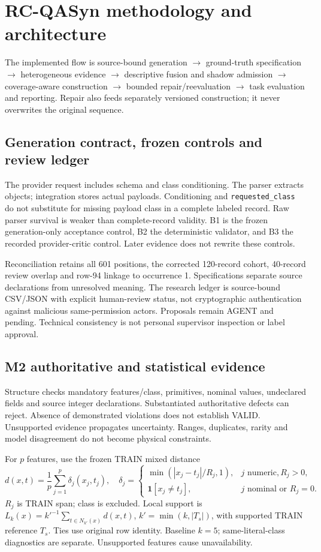 \section{RC-QASyn methodology and architecture}
The implemented flow is source-bound generation $\rightarrow$ ground-truth specification $\rightarrow$ heterogeneous evidence $\rightarrow$ descriptive fusion and shadow admission $\rightarrow$ coverage-aware construction $\rightarrow$ bounded repair/reevaluation $\rightarrow$ task evaluation and reporting. Repair also feeds separately versioned construction; it never overwrites the original sequence.

\subsection{Generation contract, frozen controls and review ledger}
The provider request includes schema and class conditioning. The parser extracts objects; integration stores actual payloads. Conditioning and \texttt{requested\_class} do not substitute for missing payload class in a complete labeled record. Raw parser survival is weaker than complete-record validity. B1 is the frozen generation-only acceptance control, B2 the deterministic validator, and B3 the recorded provider-critic control. Later evidence does not rewrite these controls.

Reconciliation retains all 601 positions, the corrected 120-record cohort, 40-record review overlap and row-94 linkage to occurrence 1. Specifications separate source declarations from unresolved meaning. The research ledger is source-bound CSV/JSON with explicit human-review status, not cryptographic authentication against malicious same-permission actors. Proposals remain AGENT and pending. Technical consistency is not personal supervisor inspection or label approval.

\subsection{M2 authoritative and statistical evidence}
Structure checks mandatory features/class, primitives, nominal values, undeclared fields and source integer declarations. Substantiated authoritative defects can reject. Absence of demonstrated violations does not establish VALID. Unsupported evidence propagates uncertainty. Ranges, duplicates, rarity and model disagreement do not become physical constraints.

For $p$ features, use the frozen TRAIN mixed distance
\begin{equation}
d(x,t)=\frac1p\sum_{j=1}^p\delta_j(x_j,t_j),\quad
\delta_j=\begin{cases}\min(|x_j-t_j|/R_j,1),&j\text{ numeric},R_j>0,\\
\mathbf1[x_j\ne t_j],&j\text{ nominal or }R_j=0.\end{cases}
\end{equation}
$R_j$ is TRAIN span; class is excluded. Local support is $L_k(x)=k'^{-1}\sum_{t\in N_{k'}(x)}d(x,t)$, $k'=\min(k,|T_s|)$, with supported TRAIN reference $T_s$. Ties use original row identity. Baseline $k=5$; same-literal-class diagnostics are separate. Unsupported features cause unavailability.

